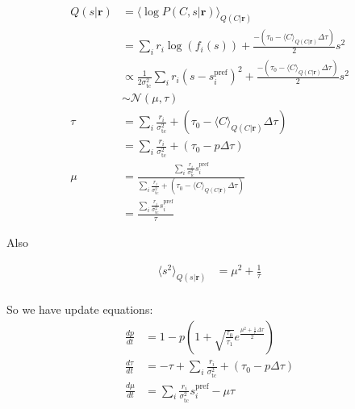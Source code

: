 \documentclass[12pt]{article}
\begin{document}
\begin{equation}
\begin{aligned}
Q(s|\mathbf{r}) &= \langle \log P(C, s|\mathbf{r}) \rangle_{Q(C|\mathbf{r})}\\
&= \sum_i r_i \log(f_i(s)) + \frac{- (\tau_0 - \langle C \rangle_{Q(C|\mathbf{r})} \Delta \tau)}{2} s^2\\
&\propto \frac{1}{2 \sigma^2_{\text{tc}}} \sum_i r_i (s - s_i^{\text{pref}})^2 + \frac{- (\tau_0 - \langle C \rangle_{Q(C|\mathbf{r})} \Delta \tau)}{2} s^2\\
&\sim \mathcal{N} (\mu, \tau)\\
\tau &= \sum_i \frac{r_i}{\sigma^2_{\text{tc}}}+ (\tau_0 - \langle C \rangle_{Q(C|\mathbf{r})} \Delta \tau)\\
&= \sum_i \frac{r_i}{\sigma^2_{\text{tc}}}+ (\tau_0 - p \Delta \tau)\\
\mu &= \frac{\sum_i \frac{r_i}{\sigma^2_{\text{tc}}}s_i^{\text{pref}}}{\sum_i \frac{r_i}{\sigma^2_{\text{tc}}}+ (\tau_0 - \langle C \rangle_{Q(C|\mathbf{r})} \Delta \tau)}\\
&= \frac{\sum_i \frac{r_i}{\sigma^2_{\text{tc}}}s_i^{\text{pref}}}{\tau}
\end{aligned}
\end{equation}

Also

\begin{equation}
\begin{aligned}
\langle s^2 \rangle_{Q(s|\mathbf{r})} &= \mu^2 + \frac{1}{\tau}\\
\end{aligned}
\end{equation}

So we have update equations:
\begin{equation}
\begin{aligned}
\frac{dp}{dt} &= 1 - p(1 + \sqrt{\frac{\tau_0}{\tau_1}} e^{\frac{\mu^2 + \frac{1}{\tau} \Delta \tau}{2}})\\
\frac{d \tau}{dt} &= -\tau + \sum_i \frac{r_i}{\sigma^2_{\text{tc}}}+ (\tau_0 - p \Delta \tau)\\
\frac{d \mu}{dt} &= \sum_i \frac{r_i}{\sigma^2_{\text{tc}}}s_i^{\text{pref}} - \mu \tau\\
\end{aligned}
\end{equation}
\end{document}
